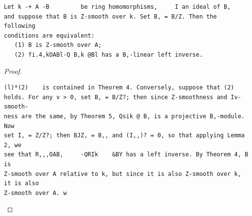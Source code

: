 \begin{theorem}\label{mcrt-auto-theorem-28-6}\uses{}
\begin{verbatim}
Let k -+ A -B         be ring homomorphisms,     I an ideal of B,
and suppose that B is Z-smooth over k. Set B, = B/Z. Then the following
conditions are equivalent:
   (1) B is Z-smooth over A;
   (2) fi.4,kOABl-Q B,k @Bl has a B,-linear left inverse.
\end{verbatim}
\end{theorem}
\begin{proof}
\begin{verbatim}
(l)*(2)    is contained in Theorem 4. Conversely, suppose that (2)
holds. For any v > 0, set B, = B/Z?; then since Z-smoothness and Iv-smooth-
ness are the same, by Theorem 5, Qsik @ B, is a projective B,-module. Now
set I, = Z/Z?; then BJZ, = B,, and (I,,)? = 0, so that applying Lemma 2, we
see that R,,,OAB,     -QRIk    &BY has a left inverse. By Theorem 4, B is
Z-smooth over A relative to k, but since it is also Z-smooth over k, it is also
Z-smooth over A. w
\end{verbatim}
\end{proof}


